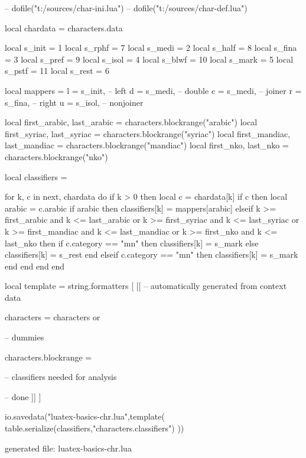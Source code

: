 

\startluacode

-- dofile("t:/sources/char-ini.lua")
-- dofile("t:/sources/char-def.lua")

local chardata   = characters.data

local s_init = 1    local s_rphf =  7
local s_medi = 2    local s_half =  8
local s_fina = 3    local s_pref =  9
local s_isol = 4    local s_blwf = 10
local s_mark = 5    local s_pstf = 11
local s_rest = 6

local mappers = {
    l = s_init,  -- left
    d = s_medi,  -- double
    c = s_medi,  -- joiner
    r = s_fina,  -- right
    u = s_isol,  -- nonjoiner
}

local first_arabic,  last_arabic  = characters.blockrange("arabic")
local first_syriac,  last_syriac  = characters.blockrange("syriac")
local first_mandiac, last_mandiac = characters.blockrange("mandiac")
local first_nko,     last_nko     = characters.blockrange("nko")

local classifiers = { }

for k, c in next, chardata do
    if k > 0 then
        local c = chardata[k]
        if c then
            local arabic = c.arabic
            if arabic then
                classifiers[k] = mappers[arabic]
            elseif k >= first_arabic  and k <= last_arabic  or k >= first_syriac  and k <= last_syriac  or
                   k >= first_mandiac and k <= last_mandiac or k >= first_nko     and k <= last_nko     then
                if c.category == "mn" then
                    classifiers[k] = s_mark
                else
                    classifiers[k] = s_rest
                end
            elseif c.category == "mn" then
                classifiers[k] = s_mark
            end
        end
    end
end

local template = string.formatters [ [[
-- automatically generated from context data

characters = characters or { }

-- dummies

characters.blockrange = { }

-- classifiers needed for analysis


-- done
]] ]

io.savedata("luatex-basics-chr.lua",template(
    table.serialize(classifiers,"characters.classifiers")
))

\stopluacode

\startTEXpage[offset=10pt]
    \tttf generated file: luatex-basics-chr.lua
\stopTEXpage
